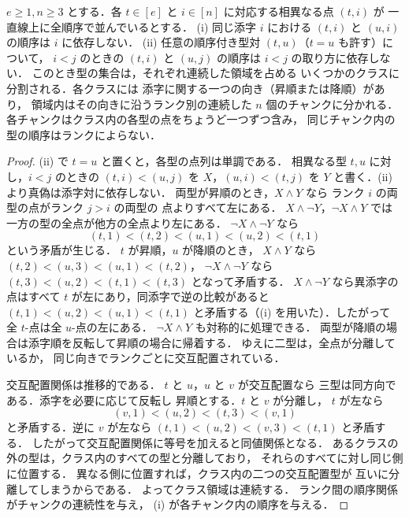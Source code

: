 \begin{lemma}[均質なブロック配置の構造]
\label{lem:group-block-order}
$e\ge1,n\ge3$ とする．各 $t\in[e]$ と
$i\in[n]$ に対応する相異なる点 $(t,i)$ が
一直線上に全順序で並んでいるとする．
(i) 同じ添字 $i$ における $(t,i)$ と $(u,i)$ の順序は
$i$ に依存しない．
(ii) 任意の順序付き型対 $(t,u)$（$t=u$ も許す）について，
$i<j$ のときの $(t,i)$ と $(u,j)$ の順序は
$i<j$ の取り方に依存しない．
このとき型の集合は，それぞれ連続した領域を占める
いくつかのクラスに分割される．各クラスには
添字に関する一つの向き（昇順または降順）があり，
領域内はその向きに沿うランク別の連続した
$n$ 個のチャンクに分かれる．
各チャンクはクラス内の各型の点をちょうど一つずつ含み，
同じチャンク内の型の順序はランクによらない．
\end{lemma}
\begin{proof}
(ii) で $t=u$ と置くと，各型の点列は単調である．
相異なる型 $t,u$ に対し，$i<j$ のときの
$(t,i)<(u,j)$ を $X$，$(u,i)<(t,j)$ を $Y$
と書く．(ii) より真偽は添字対に依存しない．
両型が昇順のとき，$X\land Y$ なら
ランク $i$ の両型の点がランク $j>i$ の両型の
点よりすべて左にある．
$X\land\neg Y$，$\neg X\land Y$ では
一方の型の全点が他方の全点より左にある．
$\neg X\land\neg Y$ なら
\[
 (t,1)<(t,2)<(u,1)<(u,2)<(t,1)
\]
という矛盾が生じる．
$t$ が昇順，$u$ が降順のとき，
$X\land Y$ なら
$(t,2)<(u,3)<(u,1)<(t,2)$，
$\neg X\land\neg Y$ なら
$(t,3)<(u,2)<(t,1)<(t,3)$
となって矛盾する．
$X\land\neg Y$ なら異添字の点はすべて
$t$ が左にあり，同添字で逆の比較があると
$(t,1)<(u,2)<(u,1)<(t,1)$
と矛盾する（(i) を用いた）．したがって
全 $t$-点は全 $u$-点の左にある．
$\neg X\land Y$ も対称的に処理できる．
両型が降順の場合は添字順を反転して昇順の場合に帰着する．
ゆえに二型は，全点が分離しているか，
同じ向きでランクごとに交互配置されている．

交互配置関係は推移的である．
$t$ と $u$，$u$ と $v$ が交互配置なら
三型は同方向である．添字を必要に応じて反転し
昇順とする．$t$ と $v$ が分離し，
$t$ が左なら
\[
 (v,1)<(u,2)<(t,3)<(v,1)
\]
と矛盾する．逆に $v$ が左なら
$(t,1)<(u,2)<(v,3)<(t,1)$
と矛盾する．
したがって交互配置関係に等号を加えると同値関係となる．
あるクラスの外の型は，クラス内のすべての型と分離しており，
それらのすべてに対し同じ側に位置する．
異なる側に位置すれば，クラス内の二つの交互配置型が
互いに分離してしまうからである．
よってクラス領域は連続する．
ランク間の順序関係がチャンクの連続性を与え，
(i) が各チャンク内の順序を与える．
\end{proof}

